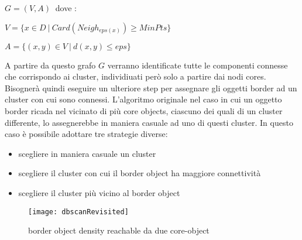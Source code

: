 $
G=(V,A) \:$ dove :

$ V= \lbrace x \in D \:| \: Card(Neigh_{eps(x)}) \ge MinPts\rbrace$


$ A= \lbrace (x,y) \in V \:| \: d(x,y) \le eps \rbrace$

A partire da questo grafo $G$ verranno identificate tutte le componenti connesse che corrispondo ai cluster, individiuati però solo a partire dai nodi cores. Bisognerà quindi eseguire un ulteriore step per assegnare gli oggetti border ad un cluster con cui sono connessi. L'algoritmo originale nel caso in cui un oggetto border   ricada nel vicinato di più core objects, ciascuno dei quali di un cluster differente, lo assegnerebbe in maniera  casuale ad uno di questi cluster. In questo caso è possibile adottare tre strategie diverse:
\begin{itemize}
\item scegliere in maniera casuale un cluster 
\item scegliere il cluster con cui il border object ha maggiore connettività 
\item scegliere il cluster più vicino al border object
\end{itemize}

\begin{figure}
\centering
\texttt{[image: dbscanRevisited]}
\caption{border object density reachable da due core-object}
\label{fig:dbscanGraphRevisited}
 \end{figure}
 
 



